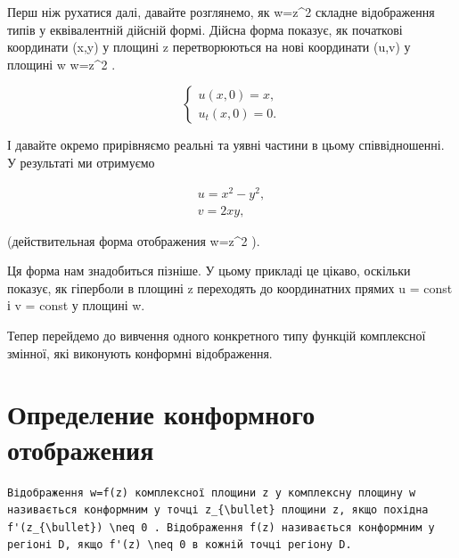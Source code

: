 \documentclass[
  ukrainian,
]{article}
\begin{document}
Перш ніж рухатися далі, давайте розглянемо, як w=z\^{}2 складне
відображення типів у еквівалентній дійсній формі. Дійсна форма показує,
як початкові координати (x,y) у площині z перетворюються на нові
координати (u,v) у площині w w=z\^{}2 .

\[
\begin{cases} u(x, 0) = x, \\ u_t(x, 0) = 0. \end{cases}
\]

І давайте окремо прирівняємо реальні та уявні частини в цьому
співвідношенні. У результаті ми отримуємо

\[
\begin{array}{ll} u=x^2-y^2,\\ v=2xy, \end{array}
\]

(действительная форма отображения w=z\^{}2 ).

Ця форма нам знадобиться пізніше. У цьому прикладі це цікаво, оскільки
показує, як гіперболи в площині z переходять до координатних прямих u =
const і v = const у площині w.

Тепер перейдемо до вивчення одного конкретного типу функцій комплексної
змінної, які виконують конформні відображення.

\section{Определение конформного
отображения}\label{ux43eux43fux440ux435ux434ux435ux43bux435ux43dux438ux435-ux43aux43eux43dux444ux43eux440ux43cux43dux43eux433ux43e-ux43eux442ux43eux431ux440ux430ux436ux435ux43dux438ux44f}

\begin{verbatim}
Відображення w=f(z) комплексної площини z у комплексну площину w називається конформним у точці z_{\bullet} площини z, якщо похідна f'(z_{\bullet}) \neq 0 . Відображення f(z) називається конформним у регіоні D, якщо f'(z) \neq 0 в кожній точці регіону D.
\end{verbatim}
\end{document}
